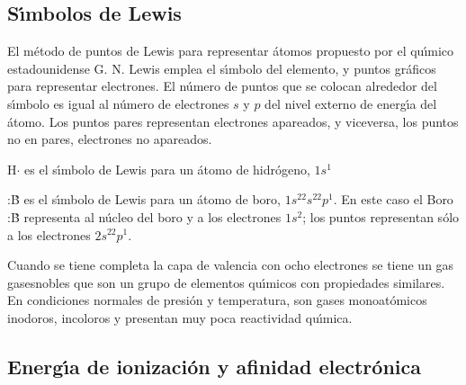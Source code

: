 \subsection{S\'{\i}mbolos de Lewis}
El m\'etodo de puntos de Lewis para representar \'atomos propuesto por el qu\'{\i}\-mi\-co estadounidense G. N. Lewis emplea el  s\'{\i}mbolo del elemento, y puntos gr\'a\-fi\-cos para representar electrones. El n\'umero de puntos que se colocan alrededor del s\'{\i}mbolo es igual al n\'umero de
electrones $s$ y $p$ del nivel externo de energ\'{\i}a del \'atomo. Los puntos pares representan electrones apareados, y viceversa, los puntos no en pares, electrones no apareados.
\newpage
\begin{example}
H$\cdot$ es el s\'{\i}mbolo de Lewis para un \'atomo de hidr\'ogeno, $1s^1$

 :\.B es el s\'{\i}mbolo de Lewis para un \'atomo de boro,
$1s^22s^22p^1$. En este caso el Boro  :\.B representa al n\'ucleo del
boro y a los electrones $1s^2$; los puntos representan s\'olo  a los
electrones $2s^22p^1$.
\end{example}

Cuando se tiene completa la capa de valencia con  ocho electrones se tiene un gas  \gls{gasesnobles} que son un grupo de elementos qu\'{\i}micos con propiedades  similares. En condiciones normales de presi\'on y temperatura, son gases monoat\'omicos inodoros, incoloros y presentan muy poca reactividad qu\'{\i}mica.

\subsection{Energ\'{\i}a de ionizaci\'on y afinidad electr\'onica}

